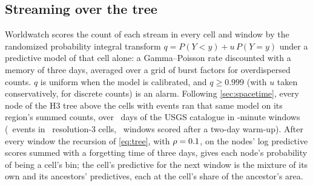 \documentclass[11pt,a4paper]{article}
\begin{document}
\subsection{Streaming over the tree}\label{sec:streaming}

Worldwatch scores the count of each stream in every cell and window by the randomized probability
integral transform $q = P(Y < y) + u\,P(Y = y)$ under a predictive model of that cell alone: a
Gamma--Poisson rate discounted with a memory of three days, averaged over a grid of burst factors
for overdispersed counts. $q$ is uniform when the model is calibrated, and $q \ge 0.999$ (with
$u$ taken conservatively, for discrete counts) is an alarm. Following \cref{sec:spacetime}, every
node of the H3 tree above the cells with events ran that same model on its region's summed counts,
over \streamDays\ days of the USGS catalogue in \streamWindowMinutes-minute windows
(\streamEvents\ events in \streamCells\ resolution-3 cells, \streamWindows\ windows scored after a
two-day warm-up). After every window the recursion of \cref{eq:tree}, with $\rho = 0.1$, on
the nodes' log predictive scores summed with a forgetting time of three days, gives each node's
probability of being a cell's bin; the cell's predictive for the next window is the mixture of its
own and its ancestors' predictives, each at the cell's share of the ancestor's area.
\end{document}
